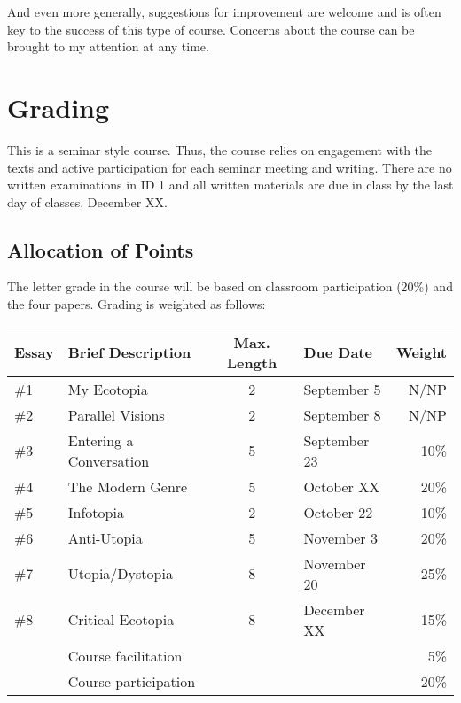 And even more generally, suggestions for improvement are welcome and is often key to the success of this type of course. Concerns about the course can be brought to my attention at any time. 

\section{Grading} 

This is a seminar style course. Thus, the course relies on engagement with the texts and active participation for each seminar meeting and writing. There are no written examinations in ID 1 and all written materials are due in class by the last day of classes, December XX. 

\subsection{Allocation of Points} 

The letter grade in the course will be based on classroom participation (20\%) and the four papers. Grading is weighted as follows:

\begin{table}
\begin{tabular}{llclr}\hline
Essay	& Brief Description	            & Max. Length	& Due Date	 & Weight \\\hline\hline
\#1	  & My Ecotopia	                  & 2	          & September 5	& N/NP \\
\#2	  & Parallel Visions              & 2           & September 8 & N/NP \\
\#3   & Entering a Conversation       & 5	          & September 23 & 	10\% \\
\#4   & The Modern Genre              & 5           & October XX  & 20\% \\
\#5   & Infotopia                     &	2	          & October 22	& 10\% \\
\#6	  & Anti-Utopia	                  & 5           &	November 3	 & 20\% \\
\#7	  & Utopia/Dystopia	              & 8           &	November 20	 & 25\% \\
\#8	  & Critical Ecotopia             & 8           &	December XX  & 15\% \\
    & Course facilitation	            &             &             &	5\% \\
    & Course participation	          &             &             & 20\% \\ \hline
\hline
\end{tabular}
\end{table}


